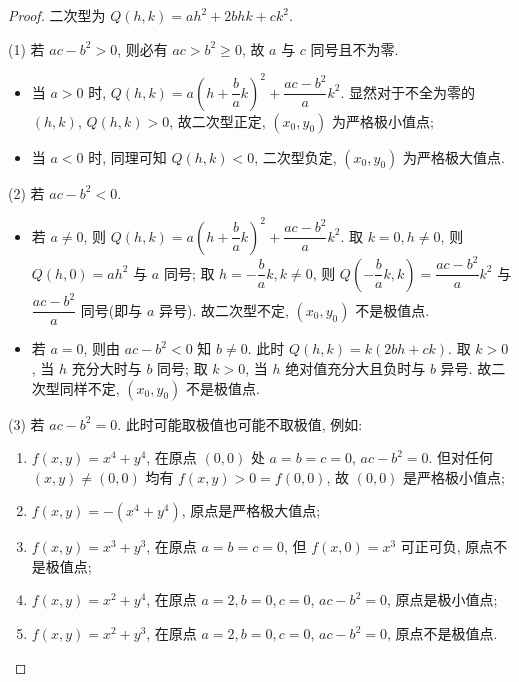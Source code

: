 \begin{proof}
二次型为 $Q(h, k) = ah^{2} + 2bhk + ck^{2}$.

(1) 若 $ac - b^{2} > 0$, 则必有 $ac > b^{2} \geqslant 0$, 故 $a$ 与 $c$ 同号且不为零.
\begin{itemize}
  \item 当 $a > 0$ 时, $Q(h, k) = a \left(h + \dfrac{b}{a}k\right)^{2} + \dfrac{ac - b^{2}}{a} k^{2}$. 显然对于不全为零的 $(h, k)$, $Q(h, k) > 0$, 故二次型正定, $(x_{0}, y_{0})$ 为严格极小值点;
  \item 当 $a < 0$ 时, 同理可知 $Q(h, k) < 0$, 二次型负定, $(x_{0}, y_{0})$ 为严格极大值点.
\end{itemize}

(2) 若 $ac - b^{2} < 0$.
\begin{itemize}
  \item 若 $a \neq 0$, 则 $Q(h, k) = a \left(h + \dfrac{b}{a}k\right)^{2} + \dfrac{ac - b^{2}}{a} k^{2}$. 取 $k = 0, h \neq 0$, 则 $Q(h, 0) = ah^{2}$ 与 $a$ 同号; 取 $h = -\dfrac{b}{a}k, k \neq 0$, 则 $Q\left(-\dfrac{b}{a}k, k\right) = \dfrac{ac - b^{2}}{a} k^{2}$ 与 $\dfrac{ac - b^{2}}{a}$ 同号(即与 $a$ 异号). 故二次型不定, $(x_{0}, y_{0})$ 不是极值点.
  \item 若 $a = 0$, 则由 $ac - b^{2} < 0$ 知 $b \neq 0$. 此时 $Q(h, k) = k(2bh + ck)$. 取 $k > 0$, 当 $h$ 充分大时与 $b$ 同号; 取 $k > 0$, 当 $h$ 绝对值充分大且负时与 $b$ 异号. 故二次型同样不定, $(x_{0}, y_{0})$ 不是极值点.
\end{itemize}

(3) 若 $ac - b^{2} = 0$. 此时可能取极值也可能不取极值, 例如:
\begin{enumerate}
  \item[(i)] $f(x, y) = x^{4} + y^{4}$, 在原点 $(0, 0)$ 处 $a = b = c = 0$, $ac - b^{2} = 0$. 但对任何 $(x, y) \neq (0, 0)$ 均有 $f(x, y) > 0 = f(0, 0)$, 故 $(0, 0)$ 是严格极小值点;
  \item[(ii)] $f(x, y) = -(x^{4} + y^{4})$, 原点是严格极大值点;
  \item[(iii)] $f(x, y) = x^{3} + y^{3}$, 在原点 $a = b = c = 0$, 但 $f(x, 0) = x^{3}$ 可正可负, 原点不是极值点;
  \item[(iv)] $f(x, y) = x^{2} + y^{4}$, 在原点 $a = 2, b = 0, c = 0$, $ac - b^{2} = 0$, 原点是极小值点;
  \item[(v)] $f(x, y) = x^{2} + y^{3}$, 在原点 $a = 2, b = 0, c = 0$, $ac - b^{2} = 0$, 原点不是极值点. \qedhere
\end{enumerate}
\end{proof}

